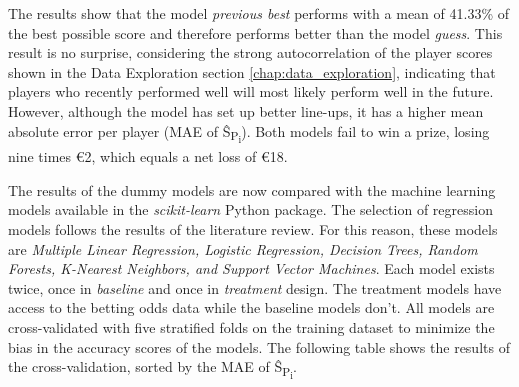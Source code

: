 The results show that the model \emph{previous best} performs with a mean of 41.33\% of the best possible score and therefore performs better than the model \emph{guess}. This result is no surprise, considering the strong autocorrelation of the player scores shown in the Data Exploration section \ref{chap:data_exploration}, indicating that players who recently performed well will most likely perform well in the future. However, although the model has set up better line-ups, it has a higher mean absolute error per player (MAE of \^{S}\textsubscript{P\textsubscript{i}}). Both models fail to win a prize, losing nine times €2, which equals a net loss of €18.

The results of the dummy models are now compared with the machine learning models available in the \emph{scikit-learn} Python package. The selection of regression models follows the results of the literature review. For this reason, these models are \emph{Multiple Linear Regression, Logistic Regression, Decision Trees, Random Forests, K-Nearest Neighbors, and Support Vector Machines}. Each model exists twice, once in \emph{baseline} and once in \emph{treatment} design. The treatment models have access to the betting odds data while the baseline models don't. All models are cross-validated with five stratified folds on the training dataset to minimize the bias in the accuracy scores of the models. The following table shows the results of the cross-validation, sorted by the MAE of \^{S}\textsubscript{P\textsubscript{i}}.

